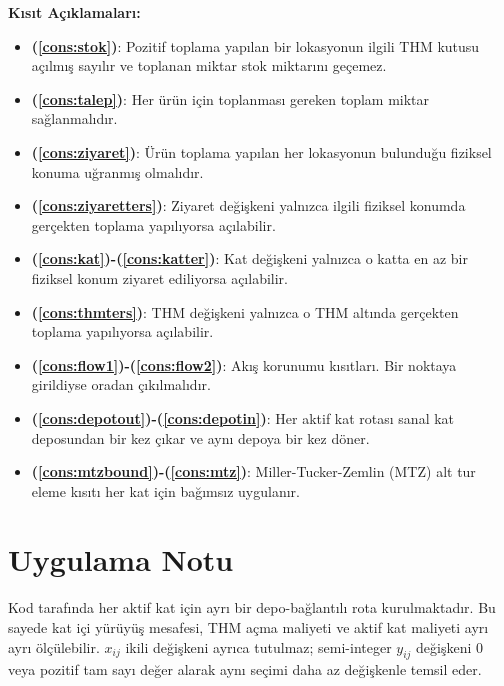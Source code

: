 \documentclass[11pt, a4paper]{article}
\begin{document}
\noindent \textbf{Kısıt Açıklamaları:}
\begin{itemize}
    \item \textbf{(\ref{cons:stok})}: Pozitif toplama yapılan bir lokasyonun ilgili THM kutusu açılmış sayılır ve toplanan miktar stok miktarını geçemez.
    \item \textbf{(\ref{cons:talep})}: Her ürün için toplanması gereken toplam miktar sağlanmalıdır.
    \item \textbf{(\ref{cons:ziyaret})}: Ürün toplama yapılan her lokasyonun bulunduğu fiziksel konuma uğranmış olmalıdır.
    \item \textbf{(\ref{cons:ziyaretters})}: Ziyaret değişkeni yalnızca ilgili fiziksel konumda gerçekten toplama yapılıyorsa açılabilir.
    \item \textbf{(\ref{cons:kat})-(\ref{cons:katter})}: Kat değişkeni yalnızca o katta en az bir fiziksel konum ziyaret ediliyorsa açılabilir.
    \item \textbf{(\ref{cons:thmters})}: THM değişkeni yalnızca o THM altında gerçekten toplama yapılıyorsa açılabilir.
    \item \textbf{(\ref{cons:flow1})-(\ref{cons:flow2})}: Akış korunumu kısıtları. Bir noktaya girildiyse oradan çıkılmalıdır.
    \item \textbf{(\ref{cons:depotout})-(\ref{cons:depotin})}: Her aktif kat rotası sanal kat deposundan bir kez çıkar ve aynı depoya bir kez döner.
    \item \textbf{(\ref{cons:mtzbound})-(\ref{cons:mtz})}: Miller-Tucker-Zemlin (MTZ) alt tur eleme kısıtı her kat için bağımsız uygulanır.
\end{itemize}

\section{Uygulama Notu}

Kod tarafında her aktif kat için ayrı bir depo-bağlantılı rota kurulmaktadır. Bu sayede kat içi yürüyüş mesafesi, THM açma maliyeti ve aktif kat maliyeti ayrı ayrı ölçülebilir. $x_{ij}$ ikili değişkeni ayrıca tutulmaz; semi-integer $y_{ij}$ değişkeni $0$ veya pozitif tam sayı değer alarak aynı seçimi daha az değişkenle temsil eder.
\end{document}
